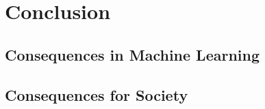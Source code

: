 
\chapter{Conclusion}
	
	\section{Consequences in Machine Learning}
	
	\section{Consequences for Society}
	